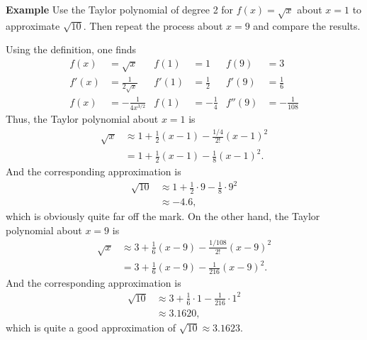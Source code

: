 \documentclass[a4paper]{book}
\begin{document}
\begin{sloppypar}
\textbf{Example} Use the Taylor polynomial of degree 2 for $f(x) = \sqrt{x}$ about $x=1$ to approximate $\sqrt{10}$. Then repeat the process about $x=9$ and compare the results. 
\begin{examplebox}
Using the definition, one finds
\begin{align*}
f(x) &= \sqrt{x} & f(1) &= 1 & f(9) &= 3 \\
f'(x) &= \frac{1}{2\sqrt{x}} & f'(1) &= \frac{1}{2} & f'(9) &= \frac{1}{6} \\
f(x) &= -\frac{1}{4x^{3/2}} & f(1) &= -\frac{1}{4} & f''(9) &= -\frac{1}{108} 
\end{align*}
Thus, the Taylor polynomial about $x=1$ is
\begin{align*}
\sqrt{x} & \approx 1 + \frac{1}{2}(x-1) - \frac{1/4}{2!}(x-1)^2 \\
&= 1 + \frac{1}{2}(x-1) - \frac{1}{8}(x-1)^2.
\end{align*}
And the corresponding approximation is
\begin{align*} 
\sqrt{10} &\approx 1 + \frac{1}{2}\cdot 9 - \frac{1}{8} \cdot 9^2 \\
&\approx -4.6, 
\end{align*}
which is obviously quite far off the mark. On the other hand, the Taylor polynomial about $x=9$ is
\begin{align*}
\sqrt{x} & \approx 3 + \frac{1}{6}(x-9) - \frac{1/{108}}{2!}(x-9)^2 \\
&= 3 + \frac{1}{6}(x-9) - \frac{1}{216}(x-9)^2.
\end{align*}
And the corresponding approximation is
\begin{align*}
\sqrt{10} &\approx 3 + \frac{1}{6}\cdot 1 - \frac{1}{216} \cdot 1^2 \\
&\approx 3.1620, 
\end{align*}
which is quite a good approximation of $\sqrt{10}\approx 3.1623$.
\end{examplebox}

\end{sloppypar}
\end{document}
